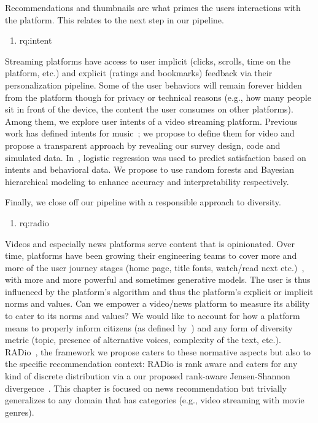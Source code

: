 Recommendations and thumbnails are what primes the users interactions with the platform. This relates to the next step in our pipeline.
%
%
\begin{enumerate}[label=\textbf{RQ\arabic*},ref={RQ\arabic*},resume,leftmargin=*]
	\item \acl{rq:intent}\label{rq:intent}
  \end{enumerate}
%
Streaming platforms have access to user implicit (clicks, scrolls, time on the platform, etc.) and explicit (ratings and bookmarks) feedback via their personalization pipeline. Some of the user behaviors will remain forever hidden from the platform though for privacy or technical reasons (e.g., how many people sit in front of the device, the content the user consumes on other platforms). Among them, we explore user intents of a video streaming platform. Previous work has defined intents for music~\cite{spotifyIntent}; we propose to define them for video and propose a transparent approach by revealing our survey design, code and simulated data. In~\cite{spotifyIntent}, logistic regression was used to predict satisfaction based on intents and behavioral data. We propose to use random forests and Bayesian hierarchical modeling to enhance accuracy and interpretability respectively.

Finally, we close off our pipeline with a responsible approach to diversity.
%
%
\begin{enumerate}[label=\textbf{RQ\arabic*},ref={RQ\arabic*},resume,leftmargin=*]
	\item \acl{rq:radio}\label{rq:radio}
\end{enumerate}
%
Videos and especially news platforms serve content that is opinionated. Over time, platforms have been growing their engineering teams to cover more and more of the user journey stages (home page, title fonts, watch/read next etc.)~\cite{NetflixReco}, with more and more powerful and sometimes generative models. The user is thus influenced by the platform's algorithm and thus the platform's explicit or implicit norms and values. Can we empower a video/news platform to measure its ability to cater to its norms and values? We would like to account for how a platform means to properly inform citizens (as defined by~\cite{helberger}) and any form of diversity metric (topic, presence of alternative voices, complexity of the text, etc.). RADio~\cite{radio}, the framework we propose caters to these normative aspects but also to the specific recommendation context: RADio is rank aware and caters for any kind of discrete distribution via a our proposed rank-aware Jensen-Shannon divergence~\cite{js}. This chapter is focused on news recommendation but trivially generalizes to any domain that has categories (e.g., video streaming with movie genres).

